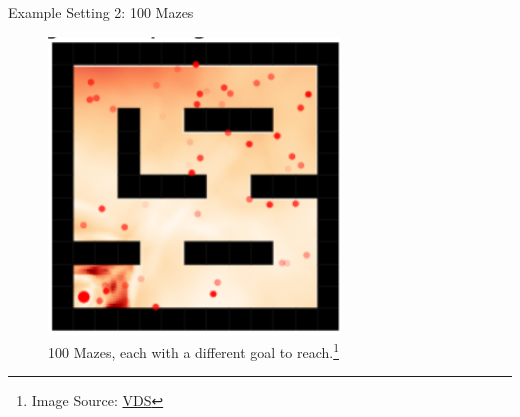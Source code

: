 \begin{frame}[c]{Example Setting 2: 100 Mazes}

\begin{figure}
\centering
\includegraphics[scale=1]{images/maze}
\caption{100 Mazes, each with a different goal to reach.\footnote{Image Source: \href{https://arxiv.org/pdf/2006.09641.pdf}{VDS}}}
\end{figure}

\end{frame}

